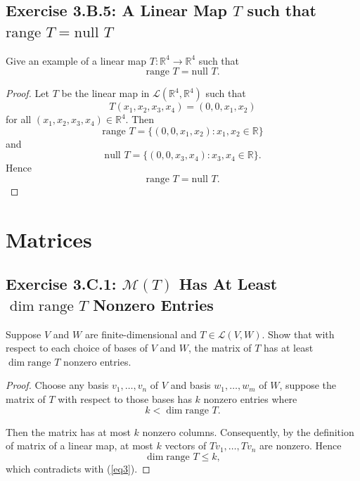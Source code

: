 \section{Exercise 3.B.5: A Linear Map $T$ such that $\text{range }T=\text{null }T$}
Give an example of a linear map $T:\mathbb{R}^4\to\mathbb{R}^4$ such that\[
\text{range }T=\text{null }T.
\]
\begin{proof}
Let $T$ be the linear map in $\mathcal{L}(\mathbb{R}^4,\mathbb{R}^4)$ such that\[
T(x_1,x_2,x_3,x_4)=(0, 0, x_1,x_2)
\]for all $(x_1,x_2,x_3,x_4)\in\mathbb{R}^4$. Then\[
\text{range }T=\{(0, 0, x_1,x_2):x_1,x_2\in\mathbb{R}\}
\]and\[
\text{null }T=\{(0,0,x_3,x_4):x_3,x_4\in\mathbb{R}\}.
\]Hence\[
\text{range }T=\text{null }T.
\]
\end{proof}

\chapter{Matrices}
\section{Exercise 3.C.1: $\mathcal{M}(T)$ Has At Least $\dim\text{range }T$ Nonzero Entries}
Suppose $V$ and $W$ are finite-dimensional and $T\in\mathcal{L}(V,W)$. Show that with respect to each choice of bases of $V$ and $W$, the matrix of $T$ has at least $\dim\text{range }T$ nonzero entries.
\begin{proof}
Choose any basis $v_1,\dots,v_n$ of $V$ and basis $w_1,\dots,w_m$ of $W$, suppose the matrix of $T$  with respect to those bases has $k$ nonzero entries where
\begin{equation}
\label{eq3}
k<\dim\text{range }T.
\end{equation}

Then the matrix has at most $k$ nonzero columns. Consequently, by the definition of matrix of a linear map, at most $k$ vectors of $Tv_1,\dots,Tv_n$ are nonzero. Hence\[\dim\text{range }T\leqslant k,\]which contradicts with (\ref{eq3}).
\end{proof}
